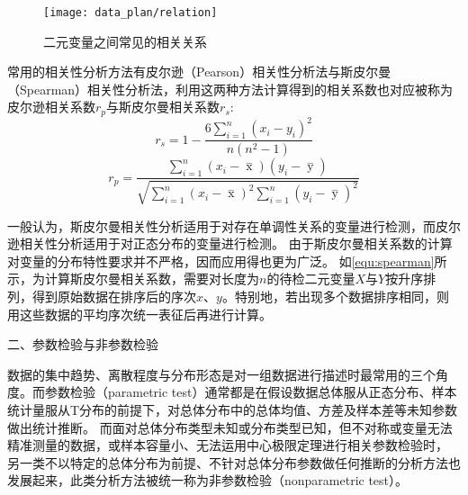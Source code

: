 \begin{figure}[htbp]
    \centering
    \texttt{[image: data\_plan/relation]}
    \caption[二元变量之间常见的相关关系]{\label{fig:relation}二元变量之间常见的相关关系\cite{IXL2022}}
\end{figure}

常用的相关性分析方法有皮尔逊（Pearson）相关性分析法与斯皮尔曼（Spearman）相关性分析法，利用这两种方法计算得到的相关系数也对应被称为皮尔逊相关系数$r_p$与斯皮尔曼相关系数$r_s$:
\begin{equation}
    \label{equ:spearman}
    r_s=1-\frac{6\sum_{i=1}^{n}(x_{i}-y_{i})^2}{n(n^2-1)}
\end{equation}
\begin{equation}
    \label{equ:pearson}
    r_p=\frac{\sum_{i=1}^n{(x_i- \mathop{x} \limits^-)(y_i- \mathop{y} \limits^-)}}{\sqrt{{\sum_{i=1}^n}{{(x_i- \mathop{x} \limits^-)^2\sum_{i=1}^n}{(y_i- \mathop{y} \limits^-)^2}}}}
\end{equation}

一般认为，斯皮尔曼相关性分析适用于对存在单调性关系的变量进行检测，而皮尔逊相关性分析适用于对正态分布的变量进行检测。
由于斯皮尔曼相关系数的计算对变量的分布特性要求并不严格，因而应用得也更为广泛。
如\autoref{equ:spearman}所示，为计算斯皮尔曼相关系数，需要对长度为$n$的待检二元变量$X$与$Y$按升序排列，得到原始数据在排序后的序次$x$、$y$。特别地，若出现多个数据排序相同，则用这些数据的平均序次统一表征后再进行计算。

二、参数检验与非参数检验

数据的集中趋势、离散程度与分布形态是对一组数据进行描述时最常用的三个角度\cite{Hu2021}。而参数检验（parametric test）通常都是在假设数据总体服从正态分布、样本统计量服从T分布的前提下，对总体分布中的总体均值、方差及样本差等未知参数做出统计推断。
而面对总体分布类型未知或分布类型已知，但不对称或变量无法精准测量的数据，或样本容量小、无法运用中心极限定理进行相关参数检验时，
另一类不以特定的总体分布为前提、不针对总体分布参数做任何推断的分析方法也发展起来，此类分析方法被统一称为非参数检验（nonparametric test）\cite{Guo2017,Hu2021,Zhang2019}。

